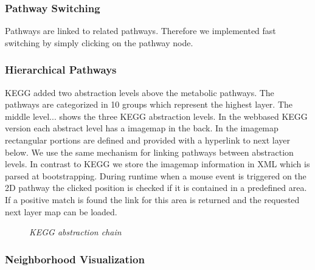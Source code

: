 \subsubsection{Pathway Switching}

Pathways are linked to related pathways. Therefore we implemented fast switching by simply clicking on the pathway node.

\subsubsection{Hierarchical Pathways}

KEGG added two abstraction levels above the metabolic pathways. The pathways are categorized in 10 groups which represent the highest layer. The middle level...
 shows the three KEGG abstraction levels. 
In the webbased KEGG version each abstract level has a imagemap in the back. In the imagemap rectangular portions are defined and provided with a hyperlink to next layer below. We use the same mechanism for linking pathways between abstraction levels. In contrast to KEGG we store the imagemap information in XML which is parsed at bootstrapping. During runtime when a mouse event is triggered on the 2D pathway the clicked position is checked if it is contained in a predefined area. If a positive match is found the link for this area is returned and the requested next layer map can be loaded.

\begin{figure}[ht]
\centering
{} 
\caption[KEGG abstraction chain]{\textit{KEGG abstraction chain}} 
\label{gfx:KEGG_abstraction_chain}
\end{figure}

\subsubsection{Neighborhood Visualization}

